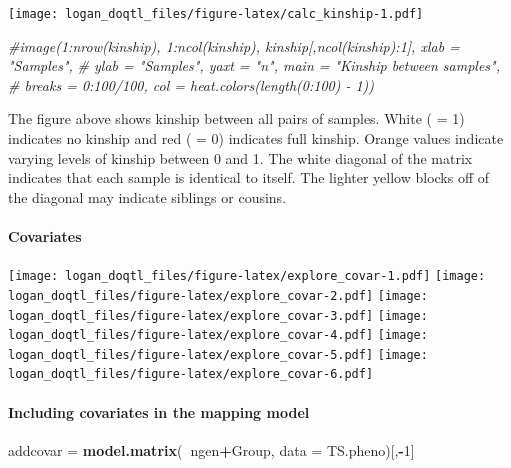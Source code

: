 \documentclass[]{article}
\newenvironment{Shaded}{\begin{snugshade}}{\end{snugshade}}
\newcommand{\KeywordTok}[1]{\textcolor[rgb]{0.13,0.29,0.53}{\textbf{#1}}}
\newcommand{\DataTypeTok}[1]{\textcolor[rgb]{0.13,0.29,0.53}{#1}}
\newcommand{\DecValTok}[1]{\textcolor[rgb]{0.00,0.00,0.81}{#1}}
\newcommand{\StringTok}[1]{\textcolor[rgb]{0.31,0.60,0.02}{#1}}
\newcommand{\CommentTok}[1]{\textcolor[rgb]{0.56,0.35,0.01}{\textit{#1}}}
\newcommand{\OperatorTok}[1]{\textcolor[rgb]{0.81,0.36,0.00}{\textbf{#1}}}
\newcommand{\NormalTok}[1]{#1}
\let\oldparagraph\paragraph
\renewcommand{\paragraph}[1]{\oldparagraph{#1}\mbox{}}
\begin{document}
\texttt{[image: logan\_doqtl\_files/figure-latex/calc\_kinship-1.pdf]}

\begin{Shaded}
\begin{Highlighting}[]
\CommentTok{#image(1:nrow(kinship), 1:ncol(kinship), kinship[,ncol(kinship):1], xlab = "Samples", }
\CommentTok{#      ylab = "Samples", yaxt = "n", main = "Kinship between samples", }
\CommentTok{#      breaks = 0:100/100, col = heat.colors(length(0:100) - 1))}
\end{Highlighting}
\end{Shaded}

The figure above shows kinship between all pairs of samples. White ( =
1) indicates no kinship and red ( = 0) indicates full kinship. Orange
values indicate varying levels of kinship between 0 and 1. The white
diagonal of the matrix indicates that each sample is identical to
itself. The lighter yellow blocks off of the diagonal may indicate
siblings or cousins.

\paragraph{\texorpdfstring{\textbf{Covariates}}{Covariates}}\label{covariates}

\texttt{[image: logan\_doqtl\_files/figure-latex/explore\_covar-1.pdf]}
\texttt{[image: logan\_doqtl\_files/figure-latex/explore\_covar-2.pdf]}
\texttt{[image: logan\_doqtl\_files/figure-latex/explore\_covar-3.pdf]}
\texttt{[image: logan\_doqtl\_files/figure-latex/explore\_covar-4.pdf]}
\texttt{[image: logan\_doqtl\_files/figure-latex/explore\_covar-5.pdf]}
\texttt{[image: logan\_doqtl\_files/figure-latex/explore\_covar-6.pdf]}

\paragraph{\texorpdfstring{\textbf{Including covariates in the mapping
model}}{Including covariates in the mapping model}}\label{including-covariates-in-the-mapping-model}

\begin{Shaded}
\begin{Highlighting}[]
\NormalTok{addcovar =}\StringTok{ }\KeywordTok{model.matrix}\NormalTok{(}\OperatorTok{~}\NormalTok{ngen}\OperatorTok{+}\NormalTok{Group, }\DataTypeTok{data =}\NormalTok{ TS.pheno)[,}\OperatorTok{-}\DecValTok{1}\NormalTok{]}
\end{Highlighting}
\end{Shaded}
\end{document}

